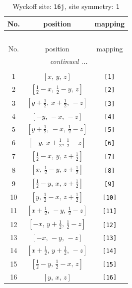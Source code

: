 \documentclass[fleqn,8pt]{jsarticle}
\begin{document}
\begin{longtable}{ccc}
\caption{Wyckoff site: {\tt 16j}, site symmetry: {\tt 1}}
 \\
 \hline \hline
No. & position & mapping \\ \hline \endfirsthead

\multicolumn{2}{l}{\tablename\ \thetable{}} \\
 \hline \hline
No. & position & mapping \\ \hline \endhead

 \hline \hline
\multicolumn{2}{r}{\footnotesize\it continued ...} \\ \endfoot

 \hline \hline
\multicolumn{2}{r}{} \\ \endlastfoot

1 & $\left[ x,\, y,\, z \right]$ & {\tt [1]} \\ \hline
2 & $\left[ \frac{1}{2} - x,\, \frac{1}{2} - y,\, z \right]$ & {\tt [2]} \\ \hline
3 & $\left[ y + \frac{1}{2},\, x + \frac{1}{2},\, - z \right]$ & {\tt [3]} \\ \hline
4 & $\left[ - y,\, - x,\, - z \right]$ & {\tt [4]} \\ \hline
5 & $\left[ y + \frac{1}{2},\, - x,\, \frac{1}{2} - z \right]$ & {\tt [5]} \\ \hline
6 & $\left[ - y,\, x + \frac{1}{2},\, \frac{1}{2} - z \right]$ & {\tt [6]} \\ \hline
7 & $\left[ \frac{1}{2} - x,\, y,\, z + \frac{1}{2} \right]$ & {\tt [7]} \\ \hline
8 & $\left[ x,\, \frac{1}{2} - y,\, z + \frac{1}{2} \right]$ & {\tt [8]} \\ \hline
9 & $\left[ \frac{1}{2} - y,\, x,\, z + \frac{1}{2} \right]$ & {\tt [9]} \\ \hline
10 & $\left[ y,\, \frac{1}{2} - x,\, z + \frac{1}{2} \right]$ & {\tt [10]} \\ \hline
11 & $\left[ x + \frac{1}{2},\, - y,\, \frac{1}{2} - z \right]$ & {\tt [11]} \\ \hline
12 & $\left[ - x,\, y + \frac{1}{2},\, \frac{1}{2} - z \right]$ & {\tt [12]} \\ \hline
13 & $\left[ - x,\, - y,\, - z \right]$ & {\tt [13]} \\ \hline
14 & $\left[ x + \frac{1}{2},\, y + \frac{1}{2},\, - z \right]$ & {\tt [14]} \\ \hline
15 & $\left[ \frac{1}{2} - y,\, \frac{1}{2} - x,\, z \right]$ & {\tt [15]} \\ \hline
16 & $\left[ y,\, x,\, z \right]$ & {\tt [16]} \\
\end{longtable}
\end{document}
